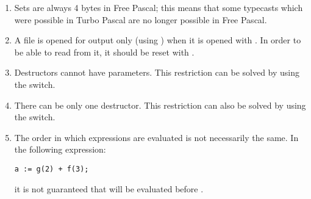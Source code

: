 \begin{enumerate}
\item Sets are always 4 bytes in Free Pascal; this means that some typecasts
which were possible in Turbo Pascal are no longer possible in Free Pascal.
\item A file is opened for output only (using ) when it is
opened with . In order to be able to read from it, it should
be reset with .
\item Destructors cannot have parameters. This restriction can be solved by
using the  switch.
\item There can be only one destructor. This restriction can also be
solved by using the  switch.
\item The order in which expressions are evaluated is not necessarily the
same. In the following expression:
\begin{verbatim}
a := g(2) + f(3);
\end{verbatim}
it is not guaranteed that  will be evaluated before .
\end{enumerate}

